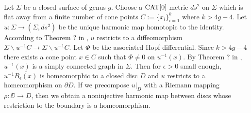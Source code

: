 \documentclass{article}
\begin{document}
Let $\Sigma$ be a closed surface of genus $g$. Choose a $\mathop{\rm CAT}\nolimits[0]$ metric $ds^2$ on $\Sigma$
which is flat away from a finite number of cone points $C:=\{x_i\}_{i=1}^k$ where $k>4g-4$. 
Let $u:\Sigma\to (\Sigma,ds^2)$ be the unique harmonic map homotopic to the identity.
According to Theorem ? in \cite{Ku}, $u$ restricts to a diffeomorphism 
$\Sigma\backslash u^{-1}C\to \Sigma\backslash u^{-1}C$. Let $\Phi$ be the associated Hopf differential.
Since $k>4g-4$ there exists a cone point $x\in C$ such that $\Phi\neq 0$ on $u^{-1}(x)$. 
By Theorem ? in \cite{Ku}, $u^{-1}(x)$ is a simply connected graph in $\Sigma$. Then for $\epsilon>0$
small enough, $u^{-1} \overline{B_\epsilon(x)}$ is homeomorphic to a closed disc $D$ and $u$ restricts to
a homeomorphism on $\partial D$. If we precompose $u|_D$ with a Riemann mapping $\rho:\DD\to D$, then
we obtain a noninjective harmonic map between discs whose restriction to the boundary is a homeomorphism.

\end{document}
